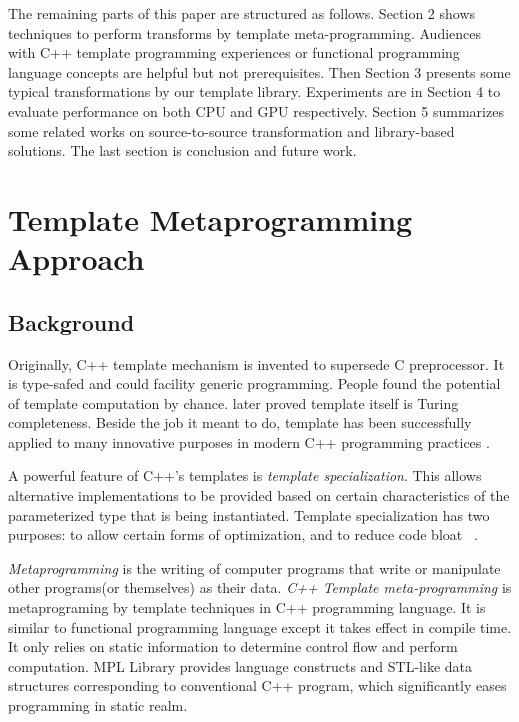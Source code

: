 \documentclass[10pt, conference, compsocconf]{IEEEtran}
\begin{document}
The remaining parts of this paper are structured as follows.
 Section 2 shows techniques to perform
transforms by template meta-programming. Audiences with C++ template
programming experiences or functional programming language concepts
are helpful but not prerequisites. Then Section 3 presents some
typical transformations by our template library. Experiments are in
Section 4 to evaluate performance on both CPU and GPU respectively.
Section 5 summarizes some related works on source-to-source
transformation and library-based solutions.  The last section is conclusion and future work.
\section{Template Metaprogramming Approach}
\subsection{Background}
Originally, C++ template mechanism is invented to supersede C
preprocessor. It is type-safed and could facility generic
programming. People found the potential of template computation by
chance. \cite{tempturing} later proved template itself is Turing
completeness. Beside the job it meant to do, template has been successfully applied to many innovative purposes in modern C++ programming practices \cite{moderncpp}. 

A powerful feature of C++'s templates is \emph{template specialization}. This allows alternative implementations to be provided based on certain characteristics of the parameterized type that is being instantiated. Template specialization has two purposes: to allow certain forms of optimization, and to reduce code bloat ~\cite{tcpl}.

\emph{Metaprogramming} is the writing of computer programs that write or
manipulate other programs(or themselves) as their data. \emph{C++ Template
 meta-programming} is metaprograming by template techniques in
C++ programming language. It is similar to functional programming
language except it takes effect in compile time. It only relies on
static information to determine control flow and perform
computation. MPL Library \cite{mpl, tempmetaprog} provides language
constructs and STL-like data structures corresponding to conventional
C++ program, which significantly eases
programming in static realm.

\end{document}
